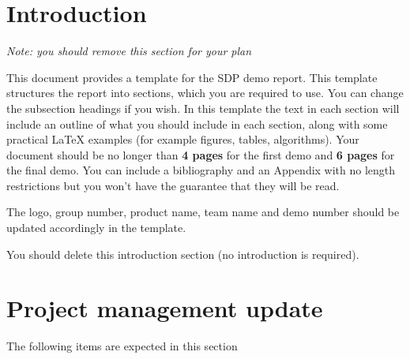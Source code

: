 \documentclass{article}
\begin{document}
 


\begin{abstract} 
The abstract should consist of one sentence describing the intended functionality of your system, followed by a few sentences (100--200 words) summarising the key advances made for this demo. This should give the reader a clear expectation of what will be demonstrated. This report will not be read by the experts that will judge you during demo days.
\end{abstract} 

\section*{Introduction}
\label{sec:intro}
\textit{Note: you should remove this section for your plan}

This document provides a template for the SDP demo report.  This template structures the report into sections, which you are required to use. You can change the subsection headings if you wish. In this template the text in each section will include an outline of what you should include in each section, along with some practical LaTeX examples (for example figures, tables, algorithms).  Your document should be no longer than \textbf{4 pages} for the first demo and \textbf{6 pages} for the final demo. You can include a bibliography and an Appendix with no length restrictions but you won't have the guarantee that they will be read. 

The logo, group number, product name, team name and demo number should be updated accordingly in the template.

You should delete this introduction section (no introduction is required).

\section{Project management update} 

The following items are expected in this section
\end{document}
